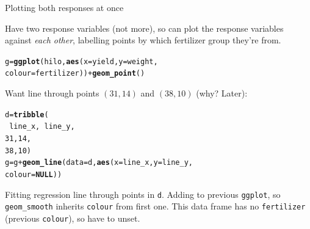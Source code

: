 \documentclass[unknownkeysallowed]{beamer}\usepackage[]{graphicx}\usepackage[]{color}
\makeatletter
\newcommand{\hlnum}[1]{\textcolor[rgb]{0.686,0.059,0.569}{#1}}%
\newcommand{\hlopt}[1]{\textcolor[rgb]{0,0,0}{#1}}%
\newcommand{\hlstd}[1]{\textcolor[rgb]{0.345,0.345,0.345}{#1}}%
\newcommand{\hlkwa}[1]{\textcolor[rgb]{0.161,0.373,0.58}{\textbf{#1}}}%
\newcommand{\hlkwb}[1]{\textcolor[rgb]{0.69,0.353,0.396}{#1}}%
\newcommand{\hlkwc}[1]{\textcolor[rgb]{0.333,0.667,0.333}{#1}}%
\newcommand{\hlkwd}[1]{\textcolor[rgb]{0.737,0.353,0.396}{\textbf{#1}}}%
\newenvironment{kframe}{%
 \def\at@end@of@kframe{}%
 \ifinner\ifhmode%
  \def\at@end@of@kframe{\end{minipage}}%
  \begin{minipage}{\columnwidth}%
 \fi\fi%
 \def\FrameCommand##1{\hskip\@totalleftmargin \hskip-\fboxsep
 \colorbox{shadecolor}{##1}\hskip-\fboxsep
     \hskip-\linewidth \hskip-\@totalleftmargin \hskip\columnwidth}%
 \MakeFramed {\advance\hsize-\width
   \@totalleftmargin\z@ \linewidth\hsize
   \@setminipage}}%
 {\par\unskip\endMakeFramed%
 \at@end@of@kframe}
\newenvironment{knitrout}{}{} %
\makeatother
\begin{document}
\begin{frame}[fragile]{Plotting both responses at once}

Have two response variables (not more), so can plot the
response variables against \emph{each other}, labelling points by
which fertilizer group they're from.

\begin{knitrout}
\color{fgcolor}\begin{kframe}
\begin{alltt}
\hlstd{g}\hlkwb{=}\hlkwd{ggplot}\hlstd{(hilo,}\hlkwd{aes}\hlstd{(}\hlkwc{x}\hlstd{=yield,}\hlkwc{y}\hlstd{=weight,}
    \hlkwc{colour}\hlstd{=fertilizer))}\hlopt{+}\hlkwd{geom_point}\hlstd{()}
\end{alltt}
\end{kframe}
\end{knitrout}

Want line through points $(31,14)$ and $(38,10)$ (why? Later):

\begin{knitrout}\footnotesize
{}\color{fgcolor}\begin{kframe}
\begin{alltt}
\hlstd{d}\hlkwb{=}\hlkwd{tribble}\hlstd{(}
    \hlopt{~}\hlstd{line_x,} \hlopt{~}\hlstd{line_y,}
    \hlnum{31}\hlstd{,} \hlnum{14}\hlstd{,}
    \hlnum{38}\hlstd{,} \hlnum{10}\hlstd{)}
\hlstd{g}\hlkwb{=}\hlstd{g}\hlopt{+}\hlkwd{geom_line}\hlstd{(}\hlkwc{data}\hlstd{=d,}\hlkwd{aes}\hlstd{(}\hlkwc{x}\hlstd{=line_x,}\hlkwc{y}\hlstd{=line_y,}
  \hlkwc{colour}\hlstd{=}\hlkwa{NULL}\hlstd{))}
\end{alltt}
\end{kframe}
\end{knitrout}

\begin{small}
Fitting regression line through points in \texttt{d}. 
Adding to previous \texttt{ggplot}, so \texttt{geom\_smooth} 
inherits \texttt{colour} from first one. This data frame has
no \texttt{fertilizer} (previous \texttt{colour}), so have to unset.
  
\end{small}
  
\end{frame}
\end{document}
